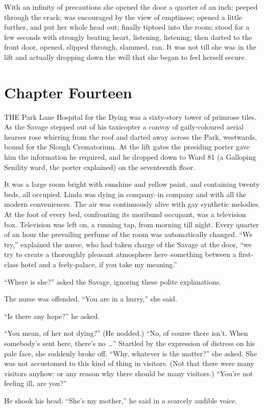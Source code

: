 \documentclass[12pt]{report}
\newcommand{\mychapter}[2]{
\setcounter{chapter}{#1}
    \setcounter{section}{0}
    \chapter*{#2}
    \addcontentsline{toc}{chapter}{#2}
}
\begin{document}
With an infinity of precautions she opened the door a quarter of an
inch; peeped through the crack; was encouraged by the view of emptiness;
opened a little further, and put her whole head out; finally tiptoed
into the room; stood for a few seconds with strongly beating heart,
listening, listening; then darted to the front door, opened, slipped
through, slammed, ran. It was not till she was in the lift and actually
dropping down the well that she began to feel herself secure.

\mychapter{14}{Chapter Fourteen}
THE Park Lane Hospital for the Dying was a sixty-story tower of primrose
tiles. As the Savage stepped out of his taxicopter a convoy of
gaily-coloured aerial hearses rose whirring from the roof and darted
away across the Park, westwards, bound for the Slough Crematorium. At
the lift gates the presiding porter gave him the information he
required, and he dropped down to Ward 81 (a Galloping Senility ward, the
porter explained) on the seventeenth floor.

It was a large room bright with sunshine and yellow paint, and
containing twenty beds, all occupied. Linda was dying in company--in
company and with all the modern conveniences. The air was continuously
alive with gay synthetic melodies. At the foot of every bed, confronting
its moribund occupant, was a television box. Television was left on, a
running tap, from morning till night. Every quarter of an hour the
prevailing perfume of the room was automatically changed. ``We try,''
explained the nurse, who had taken charge of the Savage at the door,
``we try to create a thoroughly pleasant atmosphere here--something
between a first-class hotel and a feely-palace, if you take my
meaning.''

``Where is she?'' asked the Savage, ignoring these polite explanations.

The nurse was offended. ``You are in a hurry,'' she said.

``Is there any hope?'' he asked.

``You mean, of her not dying?'' (He nodded.) ``No, of course there
isn't. When somebody's sent here, there's no \ldots{}'' Startled by the
expression of distress on his pale face, she suddenly broke off. ``Why,
whatever is the matter?'' she asked. She was not accustomed to this kind
of thing in visitors. (Not that there were many visitors anyhow: or any
reason why there should be many visitors.) ``You're not feeling ill, are
you?''

He shook his head. ``She's my mother,'' he said in a scarcely audible
voice.
\end{document}
